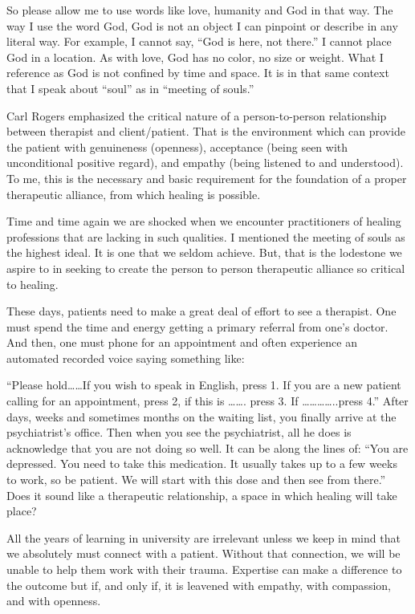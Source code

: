 \documentclass[]{book}
\begin{document}
So please allow me to use words like love, humanity and God in that way. The way I use the word God, God is not an object I can pinpoint or describe in any literal way. For example, I cannot say, ``God is here, not there.'' I cannot place God in a location. As with love, God has no color, no size or weight. What I reference as God is not confined by time and space. It is in that same context that I speak about ``soul'' as in ``meeting of souls.''

Carl Rogers emphasized the critical nature of a person-to-person relationship between therapist and client/patient. That is the environment which can provide the patient with genuineness (openness), acceptance (being seen with unconditional positive regard), and empathy (being listened to and understood). To me, this is the necessary and basic requirement for the foundation of a proper therapeutic alliance, from which healing is possible.

Time and time again we are shocked when we encounter practitioners of healing professions that are lacking in such qualities. I mentioned the meeting of souls as the highest ideal. It is one that we seldom achieve. But, that is the lodestone we aspire to in seeking to create the person to person therapeutic alliance so critical to healing.

These days, patients need to make a great deal of effort to see a therapist. One must spend the time and energy getting a primary referral from one's doctor. And then, one must phone for an appointment and often experience an automated recorded voice saying something like:

``Please hold\ldots{}\ldots{}If you wish to speak in English, press 1. If you are a new patient calling for an appointment, press 2, if this is \ldots{}\ldots{}. press 3. If \ldots{}\ldots{}\ldots{}\ldots{}..press 4.'' After days, weeks and sometimes months on the waiting list, you finally arrive at the psychiatrist's office. Then when you see the psychiatrist, all he does is acknowledge that you are not doing so well. It can be along the lines of: ``You are depressed. You need to take this medication. It usually takes up to a few weeks to work, so be patient. We will start with this dose and then see from there.'' Does it sound like a therapeutic relationship, a space in which healing will take place?

All the years of learning in university are irrelevant unless we keep in mind that we absolutely must connect with a patient. Without that connection, we will be unable to help them work with their trauma. Expertise can make a difference to the outcome but if, and only if, it is leavened with empathy, with compassion, and with openness.
\end{document}
